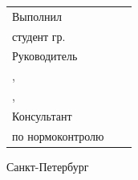\vspace{4mm plus2fill}%

\noindent
\begin{tabularx}{\linewidth}{lXl}
	Выполнил              &	   &             \\
	студент гр.~\group     &    & \Author     \\[\mfloatsep]

	Руководитель 		  &    &             \\
	\SupervisorJob,		  &    &             \\
	\SupervisorDegree, 	  &    & \Supervisor \\[\mfloatsep]
	
	
	Консультант  &    &  \\   	
	по нормоконтролю  &    & \ConsultantNorm  %
\end{tabularx} %


%
\vspace{0pt plus4fill}%


\begin{center}%
Санкт-Петербург \\
\thesisYear
\end{center}%
\restoregeometry
\newpage